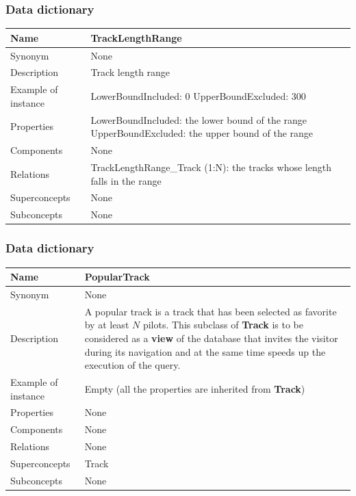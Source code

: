 \documentclass{beamer}
\begin{document}
\begin{frame}
    \frametitle{Data dictionary}
    \begin{table}
    \tiny
    \begin{tabular}{|p{2cm}|p{6cm}|}
    \hline
    Name & \textbf{TrackLengthRange} \\
    \hline
    Synonym & None \\
    \hline
    Description & Track length range \\
    \hline
    Example of instance &
    LowerBoundIncluded: 0 \newline
    UpperBoundExcluded: 300 \\
    \hline
    Properties &
    LowerBoundIncluded: the lower bound of the range \newline
    UpperBoundExcluded: the upper bound of the range \\
    \hline
    Components & None \\
    \hline
    Relations &
    TrackLengthRange\_Track (1:N): the tracks whose length falls in the range \\
    \hline
    Superconcepts & None \\
    \hline
    Subconcepts & None \\
    \hline
    \end{tabular}
    \end{table}
\end{frame}


\begin{frame}
    \frametitle{Data dictionary}
    \begin{table}
    \tiny
    \begin{tabular}{|p{2cm}|p{6cm}|}
    \hline
    Name & \textbf{PopularTrack} \\
    \hline
    Synonym & None \\
    \hline
    Description & A popular track is a track that has been selected as favorite by
    at least $N$ pilots.\newline
    This subclass of \textbf{Track} is to be considered as a \textbf{view} of the database
    that invites the visitor during its navigation and at the same time speeds up the
    execution of the query. \\
    \hline
    Example of instance & Empty (all the properties are inherited from \textbf{Track}) \\
    \hline
    Properties & None \\
    \hline
    Components & None \\
    \hline
    Relations & None \\
    \hline
    Superconcepts & Track \\
    \hline
    Subconcepts & None \\
    \hline
    \end{tabular}
    \end{table}
\end{frame}
\end{document}
